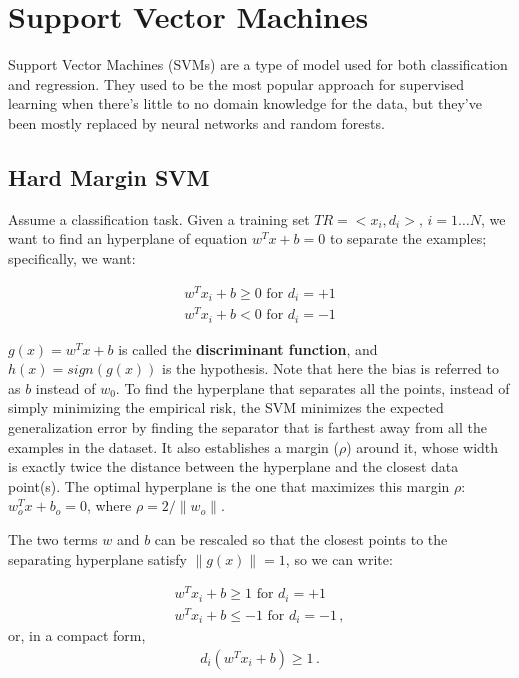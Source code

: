 \chapter{Support Vector Machines}

Support Vector Machines (SVMs) are a type of model used for both classification and regression. They used to be the most popular approach for supervised learning when there's little to no domain knowledge for the data, but they've been mostly replaced by neural networks and random forests.

\section{Hard Margin SVM}

Assume a classification task. Given a training set $TR = <x_i,d_i>, \, i=1 \dots N$, we want to find an hyperplane of equation $w^T x + b = 0$ to separate the examples; specifically, we want:

\begin{gather*}
    w^T x_i + b \geq 0 \text{ for } d_i = +1 \\
    w^T x_i + b < 0 \text{ for } d_i = -1
\end{gather*}

$g(x) = w^T x + b$ is called the \textbf{discriminant function}, and $h(x) = sign(g(x))$ is the hypothesis. Note that here the bias is referred to as $b$ instead of $w_0$. To find the hyperplane that separates all the points, instead of simply minimizing the empirical risk, the SVM minimizes the expected generalization error by finding the separator that is farthest away from all the examples in the dataset. It also establishes a margin ($\rho$) around it, whose width is exactly twice the distance between the hyperplane and the closest data point(s). The optimal hyperplane is the one that maximizes this margin $\rho$: $w_o^Tx + b_o = 0$, where $\rho = 2 / \|w_o\|$.

The two terms $w$ and $b$ can be rescaled so that the closest points to the separating hyperplane satisfy $\|g(x)\| = 1$, so we can write:

\begin{gather*}
    w^T x_i + b \geq 1 \text{ for } d_i = +1 \\
    w^T x_i + b \leq -1 \text{ for } d_i = -1 \, ,
\end{gather*}
or, in a compact form,
\begin{gather*}
    d_i(w^T x_i + b) \geq 1 \, .
\end{gather*}

